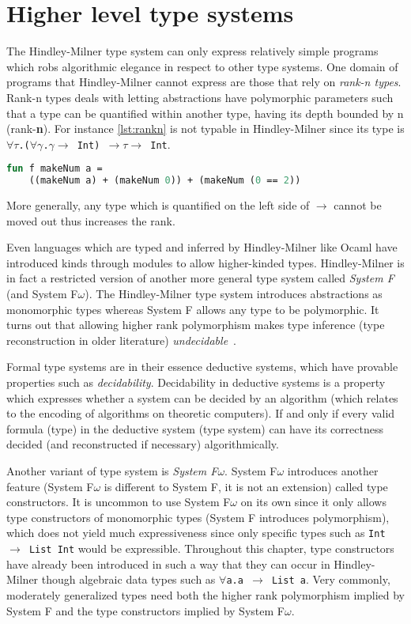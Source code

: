 \section{Higher level type systems}
The Hindley-Milner type system can only express relatively simple programs which robs algorithmic elegance in respect to other type systems.
One domain of programs that Hindley-Milner cannot express are those that rely on \textit{rank-n types}.
Rank-n types deals with letting abstractions have polymorphic parameters such that a type can be quantified within another type, having its depth bounded by n (rank-\textbf{n}).
For instance \autoref{lst:rankn} is not typable in Hindley-Milner since its type is \texttt{$\forall\tau$.($\forall\gamma$.$\gamma \rightarrow$ Int) $\rightarrow \tau \rightarrow$ Int}.
\begin{lstlisting}[language=ML,caption={Program that requires rank-n types},label={lst:rankn},mathescape=true]
fun f makeNum a =
    ((makeNum a) + (makeNum 0)) + (makeNum (0 == 2))
\end{lstlisting}
More generally, any type which is quantified on the left side of $\rightarrow$ cannot be moved out thus increases the rank.

Even languages which are typed and inferred by Hindley-Milner like Ocaml have introduced kinds through modules to allow higher-kinded types.
Hindley-Milner is in fact a restricted version of another more general type system called \textit{System F} (and System F\underline{$\omega$}).
The Hindley-Milner type system introduces abstractions as monomorphic types whereas System F allows any type to be polymorphic.
It turns out that allowing higher rank polymorphism makes type inference (type reconstruction in older literature) \textit{undecidable}~\cite{wells1999typability}.
\begin{remark}
    Formal type systems are in their essence deductive systems, which have provable properties such as \textit{decidability}.
    Decidability in deductive systems is a property which expresses whether a system can be decided by an algorithm (which relates to the encoding of algorithms on theoretic computers).
    If and only if every valid formula (type) in the deductive system (type system) can have its correctness decided (and reconstructed if necessary) algorithmically.
\end{remark}

Another variant of type system is \textit{System F\underline{$\omega$}}.
System F\underline{$\omega$} introduces another feature (System F\underline{$\omega$} is different to System F, it is not an extension) called type constructors.
It is uncommon to use System F\underline{$\omega$} on its own since it only allows type constructors of monomorphic types (System F introduces polymorphism), which does not yield much expressiveness since only specific types such as \texttt{Int $\rightarrow$ List Int} would be expressible.
Throughout this chapter, type constructors have already been introduced in such a way that they can occur in Hindley-Milner though algebraic data types such as \texttt{$\forall$a.a $\rightarrow$ List a}.
Very commonly, moderately generalized types need both the higher rank polymorphism implied by System F and the type constructors implied by System F\underline{$\omega$}.

